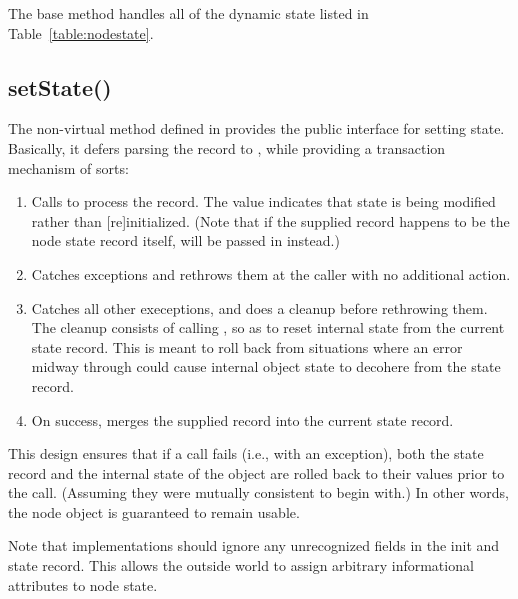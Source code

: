   The base  method handles all of the dynamic
  state listed in Table~\ref{table:nodestate}.

\subsection{setState()}

  The non-virtual  method defined in  provides the
  public interface for setting state. Basically, it defers parsing the record
  to , while providing a transaction mechanism of sorts:

  \begin{enumerate}

  \item Calls  to process the record. The
     value indicates that state is being modified rather than
    [re]initialized. (Note that if the supplied record happens to be the node
    state record itself,  will be passed in instead.)

  \item Catches  exceptions and rethrows them at
    the caller with no additional action.

  \item Catches all other execeptions, and does a cleanup before rethrowing
    them. The cleanup consists of calling , so
    as to reset internal state from the current state record. This is meant to
    roll back from situations where an error midway through 
    could cause internal object state to decohere from the state record.

  \item On success, merges the supplied record into the current state record.

  \end{enumerate}

  This design ensures that if a  call fails (i.e., with an
  exception), both the state record and the internal state of the object are
  rolled back to their values prior to the call. (Assuming they were mutually
  consistent to begin with.) In other words, the node object is guaranteed to
  remain usable.

  Note that implementations  should ignore any unrecognized
  fields in the init and state record. This allows the outside world to assign
  arbitrary informational attributes to node state.

